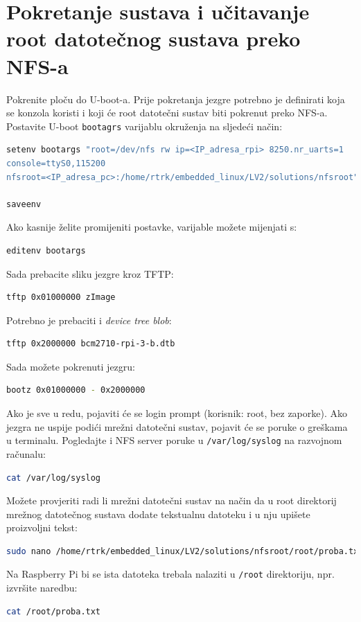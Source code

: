 \documentclass[11pt]{article}
\begin{document}
\section{Pokretanje sustava i učitavanje root datotečnog sustava preko NFS-a}
Pokrenite ploču do U-boot-a. Prije pokretanja jezgre potrebno je definirati
 koja se konzola koristi i koji će root datotečni sustav biti pokrenut preko
 NFS-a. Postavite U-boot \texttt{bootagrs} varijablu okruženja na sljedeći
 način:
\begin{lstlisting}[language=bash]
setenv bootargs "root=/dev/nfs rw ip=<IP_adresa_rpi> 8250.nr_uarts=1
console=ttyS0,115200
nfsroot=<IP_adresa_pc>:/home/rtrk/embedded_linux/LV2/solutions/nfsroot"

saveenv
\end{lstlisting}
Ako kasnije želite promijeniti postavke, varijable možete mijenjati s:
\begin{lstlisting}[language=bash]
editenv bootargs
\end{lstlisting}
Sada prebacite sliku jezgre kroz TFTP:
\begin{lstlisting}[language=bash]
tftp 0x01000000 zImage
\end{lstlisting}
Potrebno je prebaciti i \textit{device tree blob}:
\begin{lstlisting}[language=bash]
tftp 0x2000000 bcm2710-rpi-3-b.dtb
\end{lstlisting}
Sada možete pokrenuti jezgru:
\begin{lstlisting}[language=bash]
bootz 0x01000000 - 0x2000000
\end{lstlisting}
Ako je sve u redu, pojaviti će se login prompt (korisnik: root, bez zaporke).
 Ako jezgra ne uspije podići mrežni datotečni sustav, pojavit će se poruke o
 greškama u terminalu. Pogledajte i NFS server poruke u \texttt{/var/log/syslog}
 na razvojnom računalu:
\begin{lstlisting}[language=bash]
cat /var/log/syslog
\end{lstlisting}
Možete provjeriti radi li mrežni datotečni sustav na način da u root direktorij
 mrežnog datotečnog sustava dodate tekstualnu datoteku i u nju upišete
 proizvoljni tekst:
\begin{lstlisting}[language=bash]
sudo nano /home/rtrk/embedded_linux/LV2/solutions/nfsroot/root/proba.txt
\end{lstlisting}
Na Raspberry Pi bi se ista datoteka trebala nalaziti u \texttt{/root}
 direktoriju, npr. izvršite naredbu:
\begin{lstlisting}[language=bash]
cat /root/proba.txt
\end{lstlisting}
\end{document}
